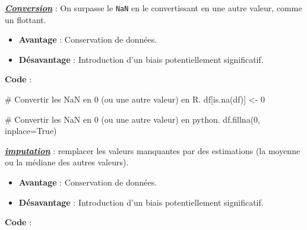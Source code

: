 \documentclass[
  letterpaper,
  DIV=11,
  numbers=noendperiod]{scrartcl}
\newenvironment{Shaded}{\begin{snugshade}}{\end{snugshade}}
\newcommand{\AttributeTok}[1]{\textcolor[rgb]{0.40,0.45,0.13}{#1}}
\newcommand{\CommentTok}[1]{\textcolor[rgb]{0.37,0.37,0.37}{#1}}
\newcommand{\ConstantTok}[1]{\textcolor[rgb]{0.56,0.35,0.01}{#1}}
\newcommand{\DecValTok}[1]{\textcolor[rgb]{0.68,0.00,0.00}{#1}}
\newcommand{\DocumentationTok}[1]{\textcolor[rgb]{0.37,0.37,0.37}{\textit{#1}}}
\newcommand{\FunctionTok}[1]{\textcolor[rgb]{0.28,0.35,0.67}{#1}}
\newcommand{\NormalTok}[1]{\textcolor[rgb]{0.00,0.23,0.31}{#1}}
\newcommand{\OtherTok}[1]{\textcolor[rgb]{0.00,0.23,0.31}{#1}}
\newcommand{\SpecialCharTok}[1]{\textcolor[rgb]{0.37,0.37,0.37}{#1}}
\providecommand{\tightlist}{%
  \setlength{\itemsep}{0pt}\setlength{\parskip}{0pt}}\usepackage{longtable,booktabs,array}
\begin{document}
\ul{\textbf{\emph{Conversion}}} : On surpasse le \texttt{NaN} en le
convertissant en une autre valeur, comme un flottant.

\begin{itemize}
\tightlist
\item
  \textbf{Avantage} : Conservation de données.
\item
  \textbf{Désavantage} : Introduction d'un biais potentiellement
  significatif.
\end{itemize}

\textbf{Code} :

\begin{Shaded}
\begin{Highlighting}[]
\CommentTok{\# Convertir les NaN en 0 (ou une autre valeur) en R.}
\NormalTok{df[}\FunctionTok{is.na}\NormalTok{(df)] }\OtherTok{\textless{}{-}} \DecValTok{0}
\end{Highlighting}
\end{Shaded}

\begin{Shaded}
\begin{Highlighting}[]
\CommentTok{\# Convertir les NaN en 0 (ou une autre valeur) en python. }
\FunctionTok{df.fillna}\NormalTok{(}\DecValTok{0}\NormalTok{, }\AttributeTok{inplace=}\NormalTok{True)}
\end{Highlighting}
\end{Shaded}

\newpage

\ul{\textbf{\emph{imputation}}} : remplacer les valeurs manquantes par
des estimations (la moyenne ou la médiane des autres valeurs).

\begin{itemize}
\tightlist
\item
  \textbf{Avantage} : Conservation de données.
\item
  \textbf{Désavantage} : Introduction d'un biais potentiellement
  significatif.
\end{itemize}

\textbf{Code} :

\begin{Shaded}
\end{Shaded}
\end{document}

